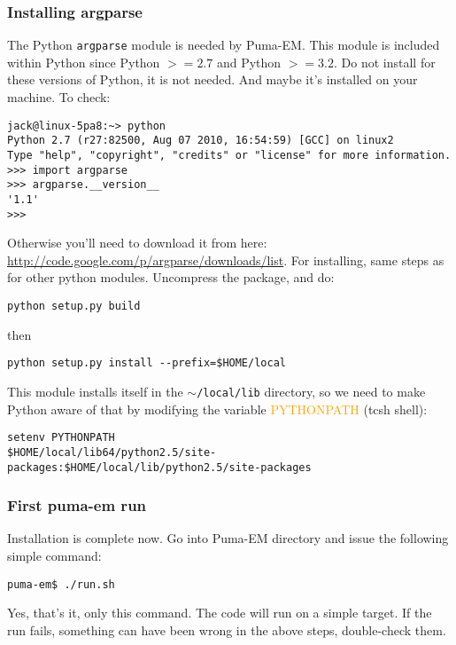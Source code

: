 \documentclass[a4paper,10pt]{book}
\newcommand{\parameter}[1] {\textcolor{orange}{\textsf{#1}}}
\begin{document}
\subsubsection{Installing argparse}
%
\par
The Python \texttt{argparse} module is needed by Puma-EM. This module is included within Python since Python $>= 2.7$ and Python $>= 3.2$. Do not install for these versions of Python, it is not needed. And maybe it's installed on your machine. To check:
\begin{verbatim}
jack@linux-5pa8:~> python
Python 2.7 (r27:82500, Aug 07 2010, 16:54:59) [GCC] on linux2
Type "help", "copyright", "credits" or "license" for more information.
>>> import argparse
>>> argparse.__version__
'1.1'
>>> 
\end{verbatim}
%
\par
Otherwise you'll need to download it from here: \url{http://code.google.com/p/argparse/downloads/list}. For installing, same steps as for other python modules. Uncompress the package, and do:
\begin{verbatim}
python setup.py build
\end{verbatim}
then
\begin{verbatim}
python setup.py install --prefix=$HOME/local
\end{verbatim}
%
\par
This module installs itself in the \texttt{$\sim$/local/lib} directory, so we need to make Python aware of that by modifying the variable \parameter{PYTHONPATH} (tcsh shell):
\begin{verbatim}
setenv PYTHONPATH 
$HOME/local/lib64/python2.5/site-packages:$HOME/local/lib/python2.5/site-packages
\end{verbatim}

\subsubsection{First puma-em run}
%
\par
Installation is complete now. Go into Puma-EM directory and issue the following simple command:
\begin{verbatim}
puma-em$ ./run.sh
\end{verbatim}
Yes, that's it, only this command. The code will run on a simple target. If the run fails, something can have been wrong in the above steps, double-check them.
\end{document}
